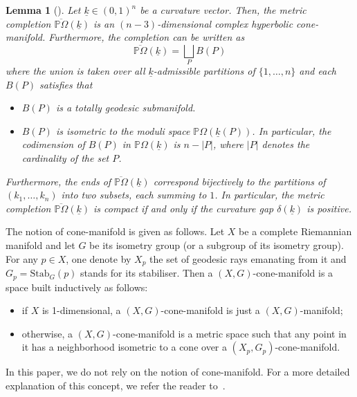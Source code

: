 \documentclass{compositio}
\numberwithin{equation}{section}
\numberwithin{figure}{section}
\theoremstyle{definition}
\theoremstyle{plain}
\newtheorem{lemma}[definition]{Lemma}
\begin{document}
{\begin{lemma}[{\cite[Theorem~0.2]{thu}}]\label{lem:thurstoncompletion}
    Let $\underline{k}\in (0,1)^n$ be a curvature vector. Then, the metric completion $\overline{\mathbb{P}\Omega}(\underline{k})$ is an $(n-3)$-dimensional complex hyperbolic cone-manifold. Furthermore, the completion can be written as
    \begin{equation}\label{equ:stratification}
        \overline{\mathbb{P}\Omega}(\underline{k}) = \bigsqcup_{P}B(P)
    \end{equation}
    where the union is taken over all $\underline{k}$-admissible partitions of $\{1, \ldots, n\}$ and each $B(P)$ satisfies that
    \begin{itemize}
        \item $B(P)$ is a totally geodesic submanifold.
        \item $B(P)$ is isometric to the moduli space $\mathbb{P}\Omega(\underline{k}(P))$. In particular, the codimension of $B(P)$ in $\mathbb{P}\Omega(\underline{k})$ is $n-|P|$, where $|P|$ denotes the cardinality of the set $P$.
    \end{itemize}
    Furthermore, the ends of $\overline{\mathbb{P}\Omega}(\underline{k})$ correspond bijectively to the partitions of $(k_1, \ldots, k_n)$ into two subsets, each summing to $1$. In particular, the metric completion $\overline{\mathbb{P}\Omega}(\underline{k})$ is compact if and only if the curvature gap $\delta(\underline{k})$ is positive.
\end{lemma}

The notion of cone-manifold is given as follows. Let $X$ be a complete Riemannian manifold and let $G$ be its isometry group (or a subgroup of its isometry group). For any $p\in X$, one denote by $X_p$ the set of geodesic rays emanating from it and $G_p=\mathrm{Stab}_G(p)$ stands for its stabiliser. Then a $(X, G)$-cone-manifold is a space built inductively as follows:
\begin{itemize}
    \item if $X$ is 1-dimensional, a $(X,G)$-cone-manifold is just a $(X,G)$-manifold;
    \item otherwise, a $(X,G)$-cone-manifold is a metric space such that any point in it has a neighborhood isometric to a cone over a $(X_p, G_p)$-cone-manifold.
\end{itemize}
In this paper, we do not rely on the notion of cone-manifold. For a more detailed explanation of this concept, we refer the reader to~\cite{McMullen}.


}
\end{document}

